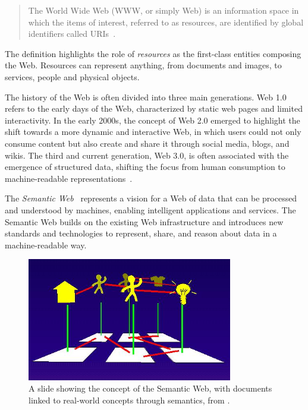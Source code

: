 \begin{quote}
The World Wide Web (WWW, or simply Web) is an information space in which the items of interest, referred to as resources, are identified by global identifiers called \acfp{URI}~\cite{wwwarch2004}.
\end{quote}

The definition highlights the role of \emph{resources} as the first-class entities composing the Web. 
%
Resources can represent anything, from documents and images, to services, people and physical objects. 

The history of the Web is often divided into three main generations.
%
Web 1.0 refers to the early days of the Web, characterized by static web pages and limited interactivity.
%
In the early 2000s, the concept of Web 2.0 emerged to highlight the shift towards a more dynamic and interactive Web, in which users could not only consume content but also create and share it through social media, blogs, and wikis.
%
The third and current generation, Web 3.0, is often associated with the emergence of structured data, shifting the focus from human consumption to machine-readable representations~\cite{Aghaei_2012}.

The \emph{Semantic Web}~\cite{berners2023semantic} represents a vision for a Web of data that can be processed and understood by machines, enabling intelligent applications and services.
%
The Semantic Web builds on the existing Web infrastructure and introduces new standards and technologies to represent, share, and reason about data in a machine-readable way. 

\begin{figure}[t]
    \centering
    \includegraphics[width=0.8\textwidth]{figures/semantic.jpg}
    \caption{A slide showing the concept of the Semantic Web, with documents linked to real-world concepts through semantics, from \cite{bernerslee1994www94plenary}.}
    \label{fig:semantic-web-idea}
\end{figure}

